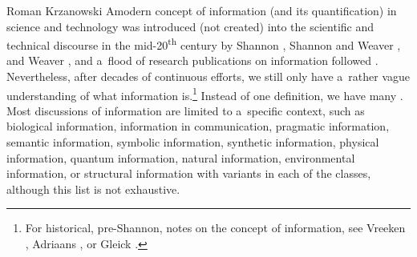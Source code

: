 \begin{artengenv}{Roman Krzanowski}
\lettrine[loversize=0.13,lines=2,lraise=-0.03,nindent=0em,findent=0.2pt]%
{A}{}modern concept of information (and its quantification) in science and technology was introduced (not created) into the scientific and technical discourse in the mid-20\textsuperscript{th} century by Shannon 
\parencite*[][]{shannon_mathematical_1948}, %
 Shannon and Weaver 
\parencites*[][]{ShannonWeaver1949}[][]{ShannonWeaver1998}, %
 and Weaver 
\parencite*[][]{weaver_mathematics_1949}, %
 and a~flood of research publications on information followed 
\parencite[e.g.,][]{carvalho_60_2009}. %
 Nevertheless, after decades of continuous efforts, we still only have a~rather vague understanding of what information is.\footnote{For historical, pre-Shannon, notes on the concept of information, see Vreeken 
\parencite*[][]{vreeken_history_2005}, %
 Adriaans 
\parencite*[][]{adriaans_information_2020}, %
 or Gleick 
\parencite*[][]{gleick_information_2011}.%
} Instead of one definition, we have many 
\parencites[e.g.,][]{adriaans_information_2020}[][]{krzanowski_ontological_2022}. %
 Most discussions of information are limited to a~specific context, such as biological information, information in communication, pragmatic information, semantic information, symbolic information, synthetic information, physical information, quantum information, natural information, environmental information, or structural information with variants in each of the classes, although this list is not exhaustive.




\end{artengenv}
